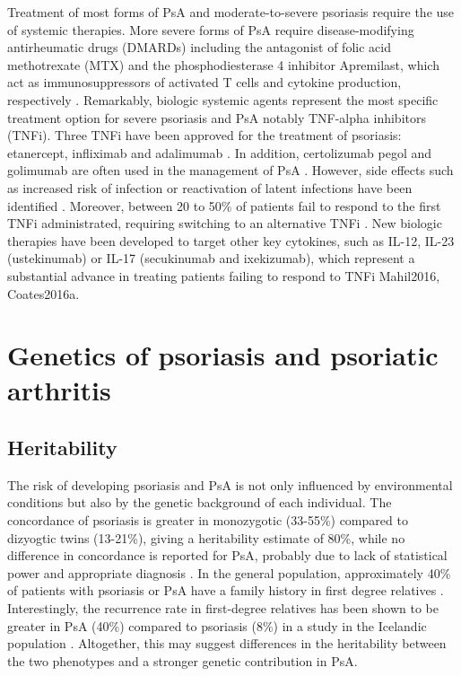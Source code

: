 Treatment of most forms of PsA and moderate-to-severe psoriasis require the use of systemic therapies. More severe forms of PsA require disease-modifying antirheumatic drugs (DMARDs) including the antagonist of folic acid methotrexate (MTX) and the phosphodiesterase 4 inhibitor Apremilast, which act as immunosuppressors of activated T cells and cytokine production, respectively \parencite{Schmitt2014, Gossec2016, Keating2017,Polachek2017}. Remarkably, biologic systemic agents represent the most specific treatment option for severe psoriasis and PsA notably TNF-alpha inhibitors (TNFi). Three TNFi have been approved for the treatment of psoriasis: etanercept, infliximab and adalimumab \parencite{Ahil2016}. In addition, certolizumab pegol and golimumab are often used in the management of PsA \parencite{Coates2016a}. However, side effects such as increased risk of infection or reactivation of latent infections have been identified \parencite{Nickoloff2004}. Moreover, between 20 to 50\% of patients fail to respond to the first TNFi administrated, requiring switching to an alternative TNFi \parencite{Abramson2016}. New biologic therapies have been developed to target other key cytokines, such as IL-12, IL-23 (ustekinumab) or IL-17 (secukinumab and ixekizumab), which represent a substantial advance in treating patients failing to respond to TNFi {Mahil2016, Coates2016a}.


 

\section{Genetics of psoriasis and psoriatic arthritis}

\subsection{Heritability}

The risk of developing psoriasis and PsA is not only influenced by environmental conditions but also by the genetic background of each individual. The concordance of psoriasis is greater in monozygotic (33-55\%) compared to dizyogtic twins (13-21\%), giving a heritability estimate of 80\%, while no difference in concordance is reported for PsA, probably due to lack of statistical power and appropriate diagnosis \parencite{Farber1974, Duffy1993, Pedersen2008}. In the general population, approximately 40\% of patients with psoriasis or PsA have a family history in first degree relatives \parencite{Gladman1986}. Interestingly, the recurrence rate in first-degree relatives has been shown to be greater in PsA (40\%) compared to psoriasis (8\%) in a study in the Icelandic population \parencite{Chandran2009}. Altogether, this may suggest differences in the heritability between the two phenotypes and a stronger genetic contribution in PsA.




